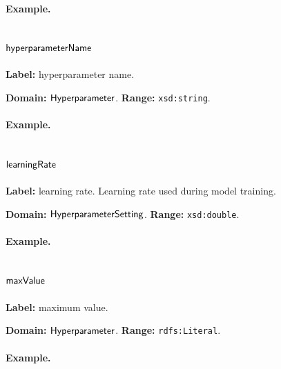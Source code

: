 \paragraph{Example.}

\subsection{$\mathsf{hyperparameterName}$}
\label{sec:term-hyperparameterName}

\textbf{Label:} hyperparameter name.

\textbf{Domain:} $\mathsf{Hyperparameter}$.
\textbf{Range:} \texttt{xsd:string}.

\paragraph{Example.}

\subsection{$\mathsf{learningRate}$}
\label{sec:term-learningRate}

\textbf{Label:} learning rate.
Learning rate used during model training.

\textbf{Domain:} $\mathsf{HyperparameterSetting}$.
\textbf{Range:} \texttt{xsd:double}.

\paragraph{Example.}

\subsection{$\mathsf{maxValue}$}
\label{sec:term-maxValue}

\textbf{Label:} maximum value.

\textbf{Domain:} $\mathsf{Hyperparameter}$.
\textbf{Range:} \texttt{rdfs:Literal}.

\paragraph{Example.}

